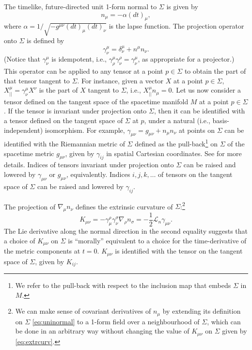 \documentclass[a4paper,11pt]{article}
\numberwithin{equation}{section}
\begin{document}
The timelike, future-directed unit 1-form normal to $\Sigma$ is given by
\begin{equation}
\label{eq:uninormal}
n_\mu=-\alpha (dt)_\mu,
\end{equation}
where $\alpha=1/\sqrt{-g^{\mu\nu}(dt)_\mu (dt)_\nu}$ is the lapse function. 
The projection operator onto $\Sigma$ is defined by
\begin{equation}
\gamma^\mu_\nu=\delta^\mu_\nu+n^\mu n_\nu.
\end{equation}
(Notice that $\gamma^\mu_\nu$ is idempotent, i.e., $\gamma^\mu_\rho \gamma^\rho_\nu=\gamma^\mu_\nu$, as appropriate for a projector.)
This operator can be applied to any tensor at a point $p\in\Sigma$ to obtain the part of that tensor tangent to $\Sigma$. For instance, given a vector $X$ at a point $p\in\Sigma$, $X_{||}^\mu=\gamma^\mu_\nu X^\nu$ is the part of $X$ tangent to $\Sigma$, i.e., $X_{||}^\mu n_\mu=0$. 
Let us now consider a tensor defined on the tangent space of the spacetime manifold $M$ at a point $p\in\Sigma$. If the tensor is invariant under projection onto $\Sigma$, then it can be identified with a tensor defined on the tangent space of $\Sigma$ at $p$, under a natural (i.e., basis-independent) isomorphism. For example, $\gamma_{\mu\nu}=g_{\mu\nu}+n_\mu n_\nu$ at points on $\Sigma$ can be identified with the Riemannian metric of $\Sigma$ defined as the pull-back\footnote{We refer to the pull-back with respect to the inclusion map that embeds $\Sigma$ in $M$.} on $\Sigma$ of the spacetime metric $g_{\mu\nu}$, given by $\gamma_{ij}$ in spatial Cartesian coordinates. See \cite{Hawking:1973uf} for more details. Indices of tensors invariant under projection onto $\Sigma$ can be raised and lowered by $\gamma_{\mu\nu}$ or $g_{\mu\nu}$, equivalently. Indices $i,j,k,\dots$ of tensors on the tangent space of $\Sigma$ can be raised and lowered by $\gamma_{ij}$.

The projection of $\nabla_\mu n_\nu$ defines the extrinsic curvature of $\Sigma$:\footnote{We can make sense of covariant derivatives of $n_\mu$ by extending its definition on $\Sigma$ \eqref{eq:uninormal} to a 1-form field over a neighbourhood of $\Sigma$, which can be done in an arbitrary way without changing the value of $K_{\mu\nu}$ on $\Sigma$ given by \eqref{eq:extrcurv}.}
\begin{equation}
\label{eq:extrcurv}
K_{\mu\nu}=-\gamma^\rho_\mu \gamma^\sigma_\nu \nabla_\rho n_\sigma=-\frac{1}{2}\mathcal{L}_n\gamma_{\mu\nu}.
\end{equation}
The Lie derivative along the normal direction in the second equality suggests that a choice of $K_{\mu\nu}$ on $\Sigma$ is ``morally'' equivalent to a choice for the time-derivative of the metric components at $t=0$. $K_{\mu\nu}$ is identified with the tensor on the tangent space of $\Sigma$, given by $K_{ij}$.
\end{document}
